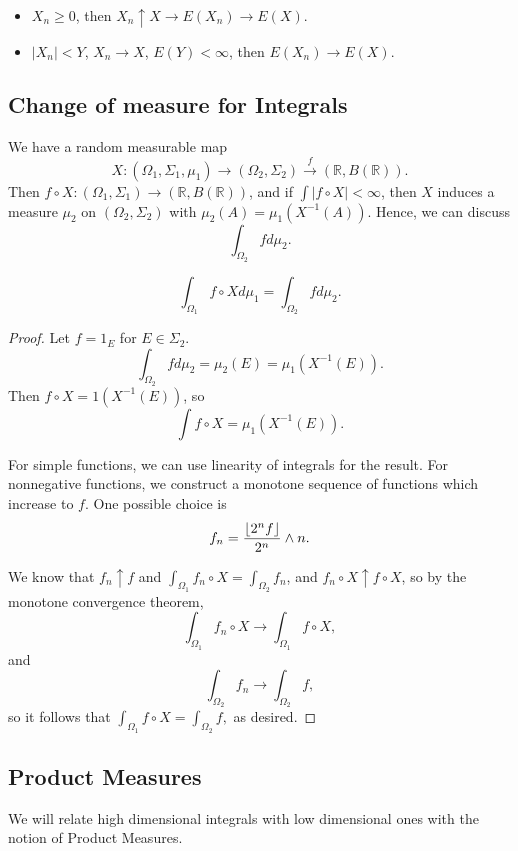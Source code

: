 \documentclass[11pt]{scrartcl}
\newcommand{\R}{\mathbb{R}}
\begin{document}
\begin{itemize}
\item $X_n \ge 0$, then $X_n \uparrow X \rightarrow E(X_n) \rightarrow E(X)$.
\item $|X_n| < Y$, $X_n \rightarrow X$, $E(Y) < \infty$, then $E(X_n) \rightarrow E(X)$.
\end{itemize}
\subsection{Change of measure for Integrals}
We have a random measurable map $$X: (\Omega_1, \Sigma_1, \mu_1) \rightarrow (\Omega_2, \Sigma_2) \xrightarrow{f} (\R, B(\R)).$$  
Then $f \circ X: (\Omega_1, \Sigma_1) \rightarrow (\R, B(\R))$, and if $\int |f \circ X| < \infty$, then $X$ induces a measure $\mu_2$ on $(\Omega_2, \Sigma_2)$ with $\mu_2(A) = \mu_1(X^{-1}(A)).$
Hence, we can discuss
$$\int_{\Omega_2}f d\mu_2.$$
\begin{thm}
$$\int_{\Omega_1} f \circ X d\mu_1 = \int_{\Omega_2} f d\mu_2.$$
\end{thm}
\begin{proof}
Let $f = 1_{E}$ for $E \in \Sigma_2$.
$$\int_{\Omega_2} f d\mu_2 = \mu_2(E) = \mu_1(X^{-1}(E)).$$
Then $f \circ X = 1(X^{-1}(E))$, so 
$$\int f \circ X = \mu_1(X^{-1}(E)).$$

For simple functions, we can use linearity of integrals for the result.  For nonnegative functions, we construct a monotone sequence of functions which increase to $f$.  One possible choice is 
$$f_n = \frac{\left\lfloor 2^n f \right\rfloor}{2^n} \wedge n.$$

We know that $f_n \uparrow f$ and $\int_{\Omega_1} f_n \circ X = \int_{\Omega_2} f_n$, and $f_n \circ X \uparrow f \circ X$, so by the monotone convergence theorem,
$$\int_{\Omega_1} f_n \circ X \rightarrow \int_{\Omega_1} f\circ X,$$
and $$\int_{\Omega_2} f_n \rightarrow \int_{\Omega_2} f,$$
so it follows that $\int_{\Omega_1}f \circ X = \int_{\Omega_2} f,$ as desired.
\end{proof}
\subsection{Product Measures}
We will relate high dimensional integrals with low dimensional ones with the notion of Product Measures.
\end{document}
